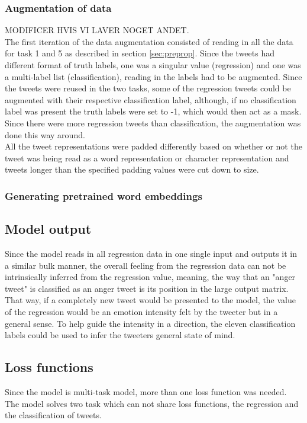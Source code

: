 \subsubsection*{Augmentation of data} \label{sec:augm}
MODIFICER HVIS VI LAVER NOGET ANDET.\\
The first iteration of the data augmentation consisted of reading in all the data for task 1 and 5 as described in section \ref{sec:preprop}. Since the tweets had different format of truth labels, one was a singular value (regression) and one was a multi-label list (classification), reading in the labels had to be augmented. Since the tweets were reused in the two tasks, some of the regression tweets could be augmented with their respective classification label, although, if no classification label was present the truth labels were set to -1, which would then act as a mask. Since there were more regression tweets than classification, the augmentation was done this way around.\\
All the tweet representations were padded differently based on whether or not the tweet was being read as a word representation or character representation and tweets longer than the specified padding values were cut down to size. 

\subsubsection*{Generating pretrained word embeddings}

\subsection{Model output}
Since the model reads in all regression data in one single input and outputs it in a similar bulk manner, the overall feeling from the regression data can not be intrinsically inferred from the regression value, meaning, the way that an "anger tweet" is classified as an anger tweet is its position in the large output matrix. That way, if a completely new tweet would be presented to the model, the value of the regression would be an emotion intensity felt by the tweeter but in a general sense. To help guide the intensity in a direction, the eleven classification labels could be used to infer the tweeters general state of mind. 

\subsection{Loss functions}
Since the model is multi-task model, more than one loss function was needed. The model solves two task which can not share loss functions, the regression and the classification of tweets.

